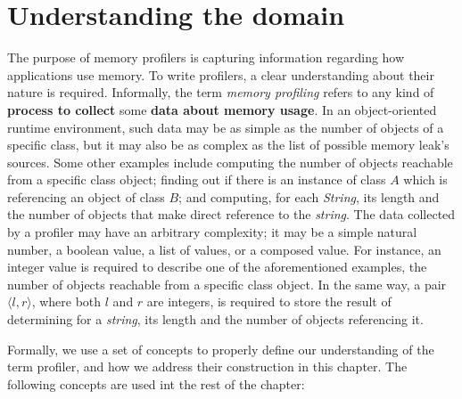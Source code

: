 
\section{Understanding the domain} \label{sec:domain-overview}

The purpose of memory profilers is capturing information regarding how applications use memory.
To write profilers, a clear understanding about their nature is required.
Informally, the term \textit{memory profiling} refers to any kind of \textbf{process to collect} some \textbf{data about memory usage}.
In an object-oriented runtime environment, such data may be as simple as the number of objects of a specific class, but it may also be as complex as the list of possible memory leak's sources.
Some other examples include computing the number of objects reachable from a specific class object; finding out if there is an instance of class $A$ which is referencing an object of class $B$; and computing, for each \textit{String}, its length and the number of objects that make direct reference to the \textit{string}.
The data collected by a profiler may have an arbitrary complexity; it may be a simple natural number, a boolean value, a list of values, or a composed value.
For instance, an integer value is required to describe one of the aforementioned examples, the number of objects reachable from a specific class object.
In the same way, a pair $\langle l,r \rangle$, where both $l$ and $r$ are integers, is required to store the result of determining for a \textit{string}, its length and the number of objects referencing it.


Formally, we use a set of concepts to properly define our understanding of the term profiler, and how we address their construction in this chapter.
The following concepts are used int the rest of the chapter:

